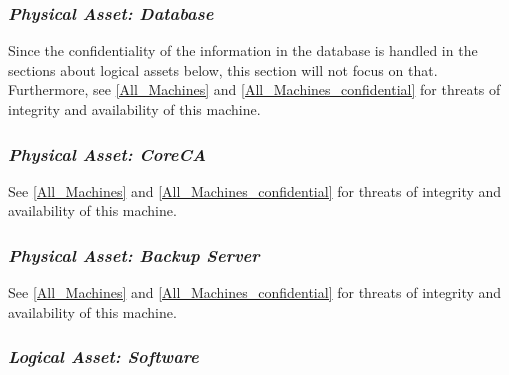 \documentclass[english]{article}
\begin{document}
\subsubsection{{\it Physical Asset: \textbf{Database}}}

Since the confidentiality of the information in the database is handled in the sections about logical assets below, this section will not focus on that. Furthermore, see \ref{All_Machines} and \ref{All_Machines_confidential} for threats of integrity and availability of this machine.

\subsubsection{{\it Physical Asset: \textbf{CoreCA}}}

See \ref{All_Machines} and \ref{All_Machines_confidential} for threats of integrity and availability of this machine.


\subsubsection{{\it Physical Asset: \textbf{Backup Server}}}

See \ref{All_Machines} and \ref{All_Machines_confidential} for threats of integrity and availability of this machine.

\subsubsection{{\it Logical Asset: \textbf{Software}}}
\end{document}
